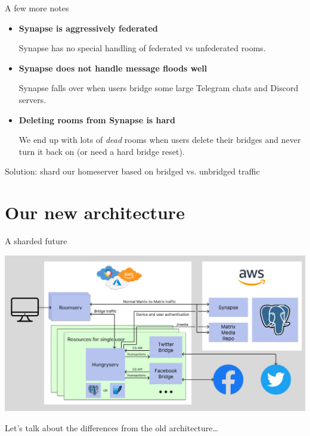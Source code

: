 \documentclass{beeper}
\begin{document}
\begin{frame}{A few more notes}
    \begin{itemize}[<+->]
        \item \textbf{Synapse is aggressively federated}

            Synapse has no special handling of federated vs unfederated rooms.

        \item \textbf{Synapse does not handle message floods well}

            Synapse falls over when users bridge some large Telegram chats and
            Discord servers.

        \item \textbf{Deleting rooms from Synapse is hard}

            We end up with lots of \textit{dead} rooms when users delete their
            bridges and never turn it back on (or need a hard bridge reset).
    \end{itemize}
\end{frame}

\begingroup
\def\insertframenumber{\relax}
\begin{frame}[standout]
    \Large
    Solution: shard our homeserver based on bridged vs. unbridged traffic
\end{frame}
\endgroup

\section{Our new architecture}

\begin{frame}{A sharded future}
    \centerline{\includegraphics[width=1.15\textwidth]{images/new-architecture}}

    Let's talk about the differences from the old architecture\ldots
\end{frame}
\end{document}
